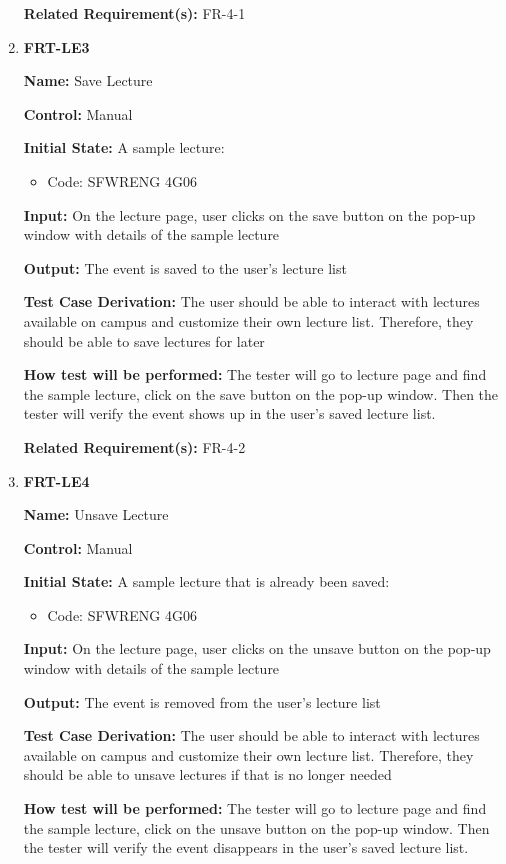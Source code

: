 \documentclass[12pt, titlepage]{article}
\begin{document}
\begin{enumerate}
\textbf{Related Requirement(s):} FR-4-1

\item{\textbf{FRT-LE3}}

\textbf{Name:} Save Lecture

\textbf{Control:} Manual
					
\textbf{Initial State:} A sample lecture:
\begin{itemize}
\item Code: SFWRENG 4G06
\end{itemize}

\textbf{Input:} On the lecture page, user clicks on the save button on the pop-up window with details of the sample lecture
					
\textbf{Output:} The event is saved to the user's lecture list

\textbf{Test Case Derivation:} The user should be able to interact with lectures available on campus and customize their own lecture list. Therefore, they should be able to save lectures for later
					
\textbf{How test will be performed:} The tester will go to lecture page and find the sample lecture, click on the save button on the pop-up window. Then the tester will verify the event shows up in the user's saved lecture list.

\textbf{Related Requirement(s):} FR-4-2

\item{\textbf{FRT-LE4}}

\textbf{Name:} Unsave Lecture

\textbf{Control:} Manual
					
\textbf{Initial State:} A sample lecture that is already been saved:
\begin{itemize}
\item Code: SFWRENG 4G06
\end{itemize}

\textbf{Input:} On the lecture page, user clicks on the unsave button on the pop-up window with details of the sample lecture
					
\textbf{Output:} The event is removed from the user's lecture list

\textbf{Test Case Derivation:} The user should be able to interact with lectures available on campus and customize their own lecture list. Therefore, they should be able to unsave lectures if that is no longer needed
					
\textbf{How test will be performed:} The tester will go to lecture page and find the sample lecture, click on the unsave button on the pop-up window. Then the tester will verify the event disappears in the user's saved lecture list.


\end{enumerate}
\end{document}
